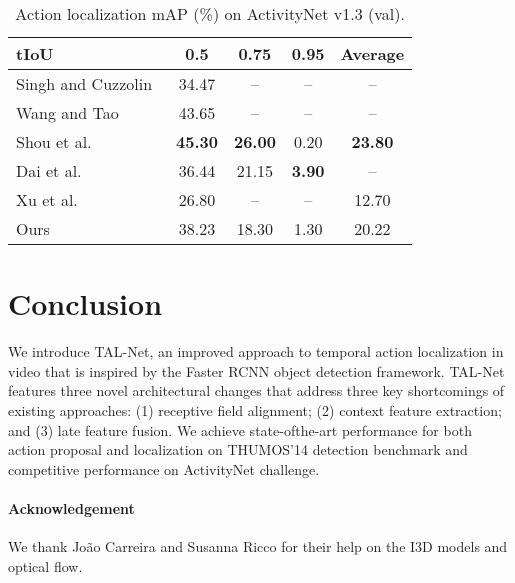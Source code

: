 \documentclass[10pt,twocolumn,letterpaper]{article}
\newcommand\Tstrut{\rule{0pt}{2.2ex}}       \newcommand\Bstrut{\rule[-1.0ex]{0pt}{0pt}} \newcommand{\TBstrut}{\Tstrut\Bstrut}
\begin{document}
\begin{table}[t]
\centering
 \small
\begin{tabular}{lcccc}
  \hline \TBstrut
  tIoU                                                & 0.5            & 0.75           & 0.95          & Average        \\
  \hline \Tstrut
  Singh and Cuzzolin~\cite{singh:2016}                & 34.47          & --             & --            & --             \\
  Wang and Tao~\cite{wang:2016}                       & 43.65          & --             & --            & --             \\
  Shou et al.~\cite{shou:cvpr2017}                    & \textbf{45.30} & \textbf{26.00} & 0.20          & \textbf{23.80} \\ Dai et al.~\cite{dai:iccv2017}                      & 36.44          & 21.15          & \textbf{3.90} & --             \\ \Bstrut
  Xu et al.~\cite{xu:iccv2017}                        & 26.80          & --             & --            & 12.70          \\ \hline \TBstrut Ours                                                & 38.23          & 18.30          & 1.30          & 20.22          \\
  \hline
 \end{tabular}
 \vspace{-2mm}
 \caption{\small Action localization mAP (\%) on ActivityNet v1.3 (val).}
\vspace{-2mm}
 \label{tab:activitynet}
\end{table}



\section{Conclusion}
We introduce TAL-Net, an improved approach to temporal action localization in
video that is inspired by the Faster RCNN object detection framework. TAL-Net
features three novel architectural changes that address three key shortcomings
of existing approaches: (1) receptive field alignment; (2) context feature
extraction; and (3) late feature fusion. We achieve state-ofthe-art performance
for both action proposal and localization on THUMOS’14 detection benchmark and
competitive performance on ActivityNet challenge.

\vspace{-3mm}

\paragraph{Acknowledgement} We thank Jo{\~a}o Carreira and Susanna Ricco for
their help on the I3D models and optical flow.
\end{document}

